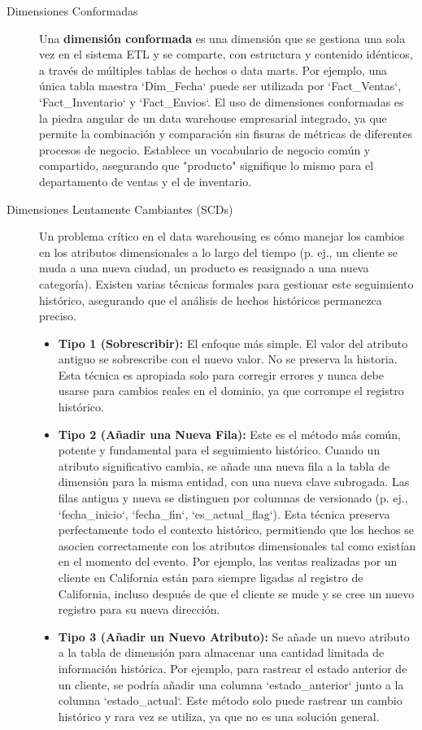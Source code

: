 \documentclass{article}
\begin{document}
\begin{description}
    \item[Dimensiones Conformadas] Una \textbf{dimensión conformada} es una dimensión que se gestiona una sola vez en el sistema ETL y se comparte, con estructura y contenido idénticos, a través de múltiples tablas de hechos o data marts. Por ejemplo, una única tabla maestra `Dim_Fecha` puede ser utilizada por `Fact_Ventas`, `Fact_Inventario` y `Fact_Envios`. El uso de dimensiones conformadas es la piedra angular de un data warehouse empresarial integrado, ya que permite la combinación y comparación sin fisuras de métricas de diferentes procesos de negocio. Establece un vocabulario de negocio común y compartido, asegurando que "producto" signifique lo mismo para el departamento de ventas y el de inventario.

    \item[Dimensiones Lentamente Cambiantes (SCDs)] Un problema crítico en el data warehousing es cómo manejar los cambios en los atributos dimensionales a lo largo del tiempo (p. ej., un cliente se muda a una nueva ciudad, un producto es reasignado a una nueva categoría). Existen varias técnicas formales para gestionar este seguimiento histórico, asegurando que el análisis de hechos históricos permanezca preciso.
    \begin{itemize}
        \item \textbf{Tipo 1 (Sobrescribir):} El enfoque más simple. El valor del atributo antiguo se sobrescribe con el nuevo valor. No se preserva la historia. Esta técnica es apropiada solo para corregir errores y nunca debe usarse para cambios reales en el dominio, ya que corrompe el registro histórico.
        \item \textbf{Tipo 2 (Añadir una Nueva Fila):} Este es el método más común, potente y fundamental para el seguimiento histórico. Cuando un atributo significativo cambia, se añade una nueva fila a la tabla de dimensión para la misma entidad, con una nueva clave subrogada. Las filas antigua y nueva se distinguen por columnas de versionado (p. ej., `fecha_inicio`, `fecha_fin`, `es_actual_flag`). Esta técnica preserva perfectamente todo el contexto histórico, permitiendo que los hechos se asocien correctamente con los atributos dimensionales tal como existían en el momento del evento. Por ejemplo, las ventas realizadas por un cliente en California están para siempre ligadas al registro de California, incluso después de que el cliente se mude y se cree un nuevo registro para su nueva dirección.
        \item \textbf{Tipo 3 (Añadir un Nuevo Atributo):} Se añade un nuevo atributo a la tabla de dimensión para almacenar una cantidad limitada de información histórica. Por ejemplo, para rastrear el estado anterior de un cliente, se podría añadir una columna `estado_anterior` junto a la columna `estado_actual`. Este método solo puede rastrear un cambio histórico y rara vez se utiliza, ya que no es una solución general.
    \end{itemize}
\end{description}
\end{document}
